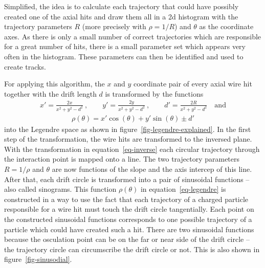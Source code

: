 Simplified, the idea is to calculate each trajectory that could have possibly created one of the axial hits and draw them all in a 2d histogram with the trajectory parameters $R$ (more precisely with $\rho = 1/R$) and $\theta$ as the coordinate axes. As there is only a small number of correct trajectories which are responsible for a great number of hits, there is a small parameter set which appears very often in the histogram. These parameters can then be identified and used to create tracks.

For applying this algorithm, the $x$ and $y$ coordinate pair of every axial wire hit together with the drift length $d$ is transformed by the functions
\begin{align} x' = \frac{2x}{x^2 + y^2 - d^2}\ , \qquad y' = \frac{2y}{x^2 + y^2 - d^2}\ ,  \qquad d' = \frac{2R}{x^2 + y^2 - d^2}\quad \text{and} \label{eq-inverse} \end{align}
\begin{align}\rho(\theta) = x' \cos(\theta) + y' \sin(\theta) \pm d' \label{eq-legendre}\end{align}
into the Legendre space as shown in figure~\ref{fig-legendre-explained}. In the first step of the transformation, the wire hits are transformed to the inversed plane. With the transformation in equation~\ref{eq-inverse} each circular trajectory through the interaction point is mapped onto a line. The two trajectory parameters $R = 1/\rho$ and $\theta$ are now functions of the slope and the axis intercep of this line. After that, each drift circle is transformed into a pair of sinusoidal functions -- also called sinograms. This function $\rho(\theta)$ in equation~\ref{eq-legendre} is constructed in a way to use the fact that each trajectory of a charged particle responsible for a wire hit must touch the drift circle tangentially. Each point on the constructed sinusoidal functions corresponds to one possible trajectory of a particle which could have created such a hit. There are two sinusoidal functions because the osculation point can be on the far or near side of the drift circle -- the trajectory circle can circumscribe the drift circle or not. This is also shown in figure~\ref{fig-sinusodial}.

